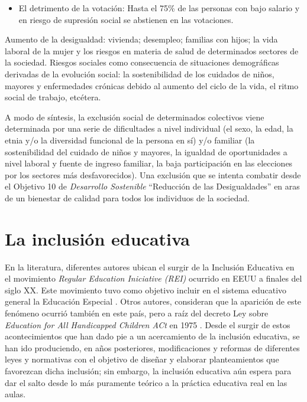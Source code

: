 \documentclass[spanish]{textolivre}
\begin{document}
\begin{itemize}
    \item El detrimento de la votación: Hasta el 75\% de las personas con bajo salario y en riesgo de supresión social se abstienen en las votaciones.
\end{itemize}

Aumento de la desigualdad: vivienda; desempleo; familias con hijos; la vida laboral de la mujer y los riesgos en materia de salud de determinados sectores de la sociedad. Riesgos sociales como consecuencia de situaciones demográficas derivadas de la evolución social: la sostenibilidad de los cuidados de niños, mayores y enfermedades crónicas debido al aumento del ciclo de la vida, el ritmo social de trabajo, etcétera.  

A modo de síntesis, la exclusión social de determinados colectivos viene determinada por una serie de dificultades a nivel individual (el sexo, la edad, la etnia y/o la diversidad funcional de la persona en sí) y/o familiar (la sostenibilidad del cuidado de niños y mayores, la igualdad de oportunidades a nivel laboral y fuente de ingreso familiar, la baja participación en las elecciones por los sectores más desfavorecidos). Una exclusión que se intenta combatir desde el Objetivo 10 de \textit{Desarrollo Sostenible} “Reducción de las Desigualdades” en aras de un bienestar de calidad para todos los individuos de la sociedad.

\section{La inclusión educativa}

En la literatura, diferentes autores ubican el surgir de la Inclusión Educativa en el movimiento \textit{Regular Education Iniciative (REI)} ocurrido en EEUU a finales del siglo XX. Este movimiento tuvo como objetivo incluir en el sistema educativo general la Educación Especial \cite{jimenez_inmaculada_2010}. Otros autores, consideran que la aparición de este fenómeno ocurrió también en este país, pero a raíz del decreto Ley sobre \textit{Education for All Handicapped Children ACt} en 1975 \cite{esteve_escuela_2010}. Desde el surgir de estos acontecimientos que han dado pie a un acercamiento de la inclusión educativa, se han ido produciendo, en años posteriores, modificaciones y reformas de diferentes leyes y normativas con el objetivo de diseñar y elaborar planteamientos que favorezcan dicha inclusión; sin embargo, la inclusión educativa aún espera para dar el salto desde lo más puramente teórico a la práctica educativa real en las aulas.
\end{document}
